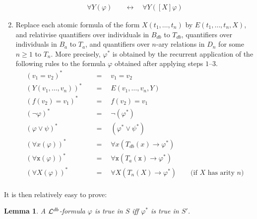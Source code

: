 \documentclass[preprint,11pt]{elsarticle}
\newtheorem{lemma}[theorem]{Lemma}
\theoremstyle{definition}
\theoremstyle{remark}
\begin{document}
\begin{enumerate}
\begin{align*}
[X]\forall Y (\varphi)& \quad \leftrightarrow \quad \forall Y ([X] \varphi)
\end{align*}
\item Replace each atomic formula of the form $X(t_1, \ldots, t_n)$ by $E(t_1, \ldots, t_n, X)$, and relativise quantifiers over individuals in $B_{db}$ to $T_{db}$, quantifiers over individuals in $B_a$ to $T_a$, and quantifiers over $n$-ary relations in $D_n$ for some $n \geq 1$ to $T_n$. More precisely, $\varphi^*$ is obtained by the recurrent application of the following rules to the formula $\varphi$ obtained after applying steps $1$--$3$. 
\begin{align*}
(v_1=v_2)^* & \quad = \quad v_1=v_2 \\ 
(Y(v_1, \ldots, v_n))^* & \quad = \quad E(v_1, \ldots, v_n, Y) \\
(f(v_2) = v_1)^* & \quad = \quad f(v_2) = v_1 \\
(\neg \varphi)^* & \quad = \quad \neg (\varphi^*) \\
(\varphi \vee \psi)^* & \quad = \quad (\varphi^* \vee \psi^*) \\
(\forall x (\varphi))^*& \quad = \quad \forall x (T_{db}(x) \rightarrow  \varphi^*)\\
(\forall \mathtt{x} (\varphi))^*& \quad = \quad \forall \mathtt{x} (T_{a}(\mathtt{x}) \rightarrow  \varphi^*)\\
(\forall X (\varphi))^*& \quad = \quad \forall X (T_{n}(X) \rightarrow  \varphi^*) \qquad \text{(if $X$ has arity $n$)}\\
\end{align*}
\end{enumerate}  

It is then relatively easy to prove:

\begin{lemma}\label{translationLemma}
A ${\cal L}^{db}$-formula $\varphi$ is true in $S$ iff $\varphi^*$ is true in $S'$.
\end{lemma}
\end{document}
